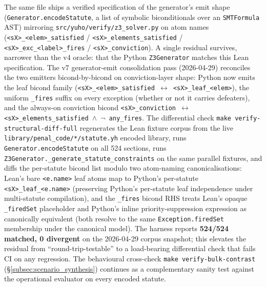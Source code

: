 The same file ships a verified specification of the
generator's emit shape (\texttt{Generator.encodeStatute}, a list
of symbolic biconditionals over an \texttt{SMTFormula} AST)
mirroring \texttt{src/yuho/verify/z3\_solver.py} on atom names
(\texttt{<sX>\_<elem>\_satisfied} /
\texttt{<sX>\_elements\_satisfied} /
\texttt{<sX>\_exc\_<label>\_fires} / \texttt{<sX>\_conviction}).
A single residual survives, narrower than the v4 oracle: that
the Python \texttt{Z3Generator} matches this Lean specification.
The v7 generator-emit consolidation pass (2026-04-29) reconciles
the two emitters bicond-by-bicond on conviction-layer shape:
Python now emits the leaf bicond family
(\texttt{<sX>\_<elem>\_satisfied $\leftrightarrow$ <sX>\_leaf\_<elem>}),
the uniform \texttt{\_fires} suffix on every exception (whether or
not it carries defeaters), and the always-on conviction bicond
\texttt{<sX>\_conviction $\leftrightarrow$ <sX>\_elements\_satisfied
$\wedge$ $\neg$ any\_fires}. The differential check
\texttt{make verify-structural-diff-full} regenerates the Lean
fixture corpus from the live \texttt{library/penal\_code/*/statute.yh}
encoded library, runs \texttt{Generator.encodeStatute} on all 524
sections, runs \texttt{Z3Generator.\_generate\_statute\_constraints}
on the same parallel fixtures, and diffs the per-statute bicond list
modulo two atom-naming canonicalisations: Lean's bare \texttt{<e.name>}
leaf atoms map to Python's per-statute \texttt{<sX>\_leaf\_<e.name>}
(preserving Python's per-statute leaf independence under multi-statute
compilation), and the \texttt{\_fires} bicond RHS treats Lean's opaque
\texttt{\_firedSet} placeholder and Python's inline priority-suppression
expression as canonically equivalent (both resolve to the same
\texttt{Exception.firedSet} membership under the canonical model).
The harness reports \textbf{524/524 matched, 0 divergent} on the
2026-04-29 corpus snapshot; this elevates the residual from
``round-trip-testable'' to a load-bearing differential check
that fails CI on any regression. The behavioural cross-check
\texttt{make verify-bulk-contrast}
(\S\ref{subsec:scenario_synthesis}) continues as a complementary
sanity test against the operational evaluator on every encoded
statute.

